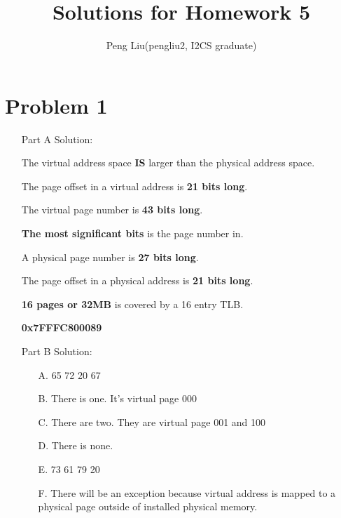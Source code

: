 \documentclass[11pt,leqno]{article}
\author{Peng Liu(pengliu2, I2CS graduate)}
\title{Solutions for Homework 5}
\begin{document}
\lstset{language=C}
\maketitle
\section*{Problem 1}

\begin{enumerate}
\item[Part A] Solution:

The virtual address space \textbf{IS} larger than the physical address space.

The page offset in a virtual address is \textbf{21 bits long}.

The virtual page number is \textbf{43 bits long}.

\textbf{The most significant bits} is the page number in.

A physical page number is \textbf{27 bits long}.

The page offset in a physical address is \textbf{21 bits long}.

\textbf{16 pages or 32MB} is covered by a 16 entry TLB.

\textbf{0x7FFFC800089}

\item[Part B] Solution:
	\begin{enumerate}
	\item[A.]
	65 72 20 67
	\item[B.]
	There is one. It's virtual page 000
	\item[C.]
	There are two. They are virtual page 001 and 100
	\item[D.]
	There is none.
	\item[E.]
	73 61 79 20
	\item[F.]
	There will be an exception because virtual address is mapped to a physical page outside of installed physical memory. 
	\end{enumerate}

\end{enumerate}
\end{document}
